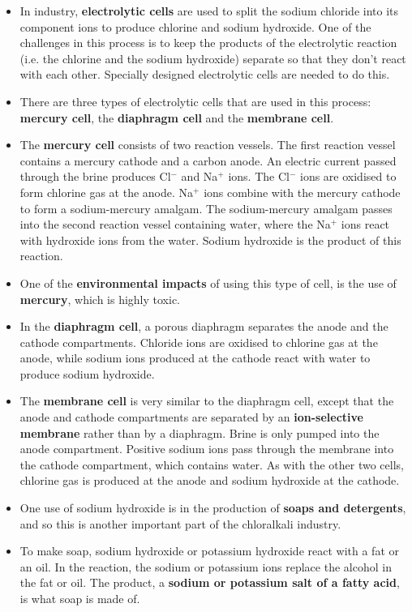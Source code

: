 \begin{itemize}
\item{In industry, \textbf{electrolytic cells} are used to split the sodium chloride into its component ions to produce chlorine and sodium hydroxide. One of the challenges in this process is to keep the products of the electrolytic reaction (i.e. the chlorine and the sodium hydroxide) separate so that they don't react with each other. Specially designed electrolytic cells are needed to do this.}
\item{There are three types of electrolytic cells that are used in this process: \textbf{mercury cell}, the \textbf{diaphragm cell} and the \textbf{membrane cell}.}
\item{The \textbf{mercury cell} consists of two reaction vessels. The first reaction vessel contains a mercury cathode and a carbon anode. An electric current passed through the brine produces Cl$^{-}$ and Na$^{+}$ ions. The Cl$^{-}$ ions are oxidised to form chlorine gas at the anode. Na$^{+}$ ions combine with the mercury cathode to form a sodium-mercury amalgam.  The sodium-mercury amalgam passes into the second reaction vessel containing water, where the Na$^{+}$ ions react with hydroxide ions from the water. Sodium hydroxide is the product of this reaction.}
\item{One of the \textbf{environmental impacts} of using this type of cell, is the use of \textbf{mercury}, which is highly toxic.}
\item{In the \textbf{diaphragm cell}, a porous diaphragm separates the anode and the cathode compartments. Chloride ions are oxidised to chlorine gas at the anode, while sodium ions produced at the cathode react with water to produce sodium hydroxide.}
\item{The \textbf{membrane cell} is very similar to the diaphragm cell, except that the anode and cathode compartments are separated by an \textbf{ion-selective membrane} rather than by a diaphragm. Brine is only pumped into the anode compartment. Positive sodium ions pass through the membrane into the cathode compartment, which contains water. As with the other two cells, chlorine gas is produced at the anode and sodium hydroxide at the cathode.}
\item{One use of sodium hydroxide is in the production of \textbf{soaps and detergents}, and so this is another important part of the chloralkali industry.}
\item{To make soap, sodium hydroxide or potassium hydroxide react with a fat or an oil. In the reaction, the sodium or potassium ions replace the alcohol in the fat or oil. The product, a \textbf{sodium or potassium salt of a fatty acid}, is what soap is made of.}

\end{itemize}
